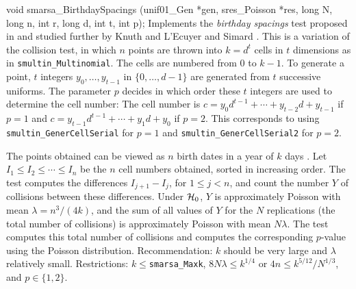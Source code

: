 void smarsa_BirthdaySpacings (unif01_Gen *gen, sres_Poisson *res,
                              long N, long n, int r, long d, int t, int p);
\endcode
 \tab
   Implements the {\em birthday spacings\/} test proposed in \cite{rMAR85a}
   and studied further by Knuth \cite{rKNU98a} and 
   L'Ecuyer and Simard \cite{rLEC01a}.
   This is a variation of the collision test, in which
   $n$ points are thrown into $k = d^t$ cells in $t$ dimensions as in
   {\tt smultin\_Multinomial}.
   The cells are numbered from 0 to $k-1$.
   To generate a point, $t$ integers $y_0,\dots,y_{t-1}$ in $\{0,\dots,d-1\}$
   are generated from $t$ successive uniforms.
   The parameter $p$ decides in which order these $t$ integers are used
   to determine the cell number: The cell number is 
   $c = y_0 d^{t-1} + \cdots + y_{t-2} d + y_{t-1}$ if $p=1$ and
   $c = y_{t-1} d^{t-1} + \cdots + y_{1} d + y_0$ if $p=2$.
   This corresponds to using {\tt smultin\_GenerCellSerial} for $p=1$
   and {\tt smultin\_GenerCellSerial2} for $p=2$.

   The points obtained can be viewed as
   $n$ birth dates in a year of $k$ days \cite {rALT88a,rMAR85a}.
   Let $I_1 \le I_2\le \cdots \le I_n$ be the $n$ cell numbers obtained,
   sorted in increasing order. The test computes the differences
   $I_{j+1} - I_{j}$, for $1\le j < n$,
   and  count the  number $Y$ of collisions between these differences.
   Under $\mathcal{H}_0$, $Y$ is approximately Poisson with mean
   $\lambda = n^3/(4k)$, and the sum of all values of $Y$ for the
   $N$ replications (the total number of  collisions) is 
   approximately Poisson with mean $N\lambda$.
   The test computes this total number of collisions and computes the
   corresponding $p$-value using the Poisson distribution.
   Recommendation: $k$ should be very large and $\lambda$ relatively small.
   Restrictions: $k \le {}${\tt smarsa\_Maxk},
   $8 N \lambda \le k^{1/4}$ or $4n \le k^{5/12}/ N^{1/3}$, and
   $p\in \{1, 2\}$. 
 \endtab
\code


